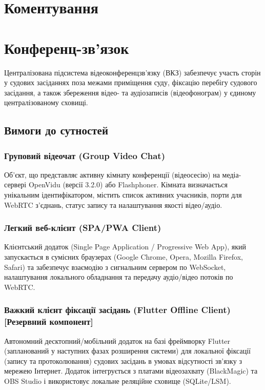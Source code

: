\documentclass{article}
\begin{document}
\section{Коментування}
\section{Конференц-зв'язок}
Централізована підсистема відеоконференцзв’язку (ВКЗ) забезпечує участь сторін у судових засіданнях поза межами приміщення суду, фіксацію перебігу судового засідання, а також збереження відео- та аудіозаписів (відеофонограм) у єдиному централізованому сховищі.

\subsection{Вимоги до сутностей}

\subsubsection{Груповий відеочат (Group Video Chat)}
Об'єкт, що представляє активну кімнату конференції (відеосесію) на медіа-сервері OpenVidu (версії 3.2.0) або Flashphoner. Кімната визначається унікальним ідентифікатором, містить список активних учасників, порти для WebRTC з'єднань, статус запису та налаштування якості відео/аудіо.

\subsubsection{Легкий веб-клієнт (SPA/PWA Client)}
Клієнтський додаток (Single Page Application / Progressive Web App), який запускається в сумісних браузерах (Google Chrome, Opera, Mozilla Firefox, Safari) та забезпечує взаємодію з сигнальним сервером по WebSocket, налаштування локального обладнання та передачу аудіо/відео потоків по WebRTC.

\subsubsection{Важкий клієнт фіксації засідань (Flutter Offline Client) [Резервний компонент]}
Автономний десктопний/мобільний додаток на базі фреймворку Flutter (запланований у наступних фазах розширення системи) для локальної фіксації (запису та протоколювання) судових засідань в умовах відсутності зв’язку з мережею Інтернет. Додаток інтегрується з платами відеозахвату (BlackMagic) та OBS Studio і використовує локальне реляційне сховище (SQLite/LSM).
\end{document}
